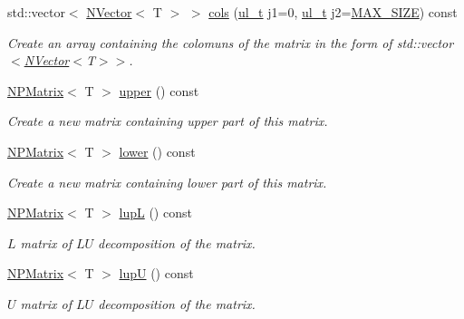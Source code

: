 \begin{Indent}
\begin{DoxyCompactItemize}
std\+::vector$<$ \mbox{\hyperlink{class_n_vector}{N\+Vector}}$<$ T $>$ $>$ \mbox{\hyperlink{class_n_p_matrix_a30c8ad7b415fa92a23375cbad3ee8e37}{cols}} (\mbox{\hyperlink{typedef_8h_a1b140a2034db3f5dfe18a987745df43a}{ul\+\_\+t}} j1=0, \mbox{\hyperlink{typedef_8h_a1b140a2034db3f5dfe18a987745df43a}{ul\+\_\+t}} j2=\mbox{\hyperlink{_n_vector_8h_a0592dba56693fad79136250c11e5a7fe}{M\+A\+X\+\_\+\+S\+I\+ZE}}) const
\begin{DoxyCompactList}\small\item\em Create an array containing the colomuns of the matrix in the form of {\ttfamily std\+::vector$<$\mbox{\hyperlink{class_n_vector}{N\+Vector}}$<$T$>$$>$}. \end{DoxyCompactList}\item 
\mbox{\hyperlink{class_n_p_matrix}{N\+P\+Matrix}}$<$ T $>$ \mbox{\hyperlink{class_n_p_matrix_a986376cd2765f1864fdac8b264f454ef}{upper}} () const
\begin{DoxyCompactList}\small\item\em Create a new matrix containing upper part of this matrix. \end{DoxyCompactList}\item 
\mbox{\hyperlink{class_n_p_matrix}{N\+P\+Matrix}}$<$ T $>$ \mbox{\hyperlink{class_n_p_matrix_a4618b342917acf71c13a89afc2189eaf}{lower}} () const
\begin{DoxyCompactList}\small\item\em Create a new matrix containing lower part of this matrix. \end{DoxyCompactList}\item 
\mbox{\hyperlink{class_n_p_matrix}{N\+P\+Matrix}}$<$ T $>$ \mbox{\hyperlink{class_n_p_matrix_a21088a7eef02d4d0a0781f616037097a}{lupL}} () const
\begin{DoxyCompactList}\small\item\em $ L $ matrix of $ LU $ decomposition of the matrix. \end{DoxyCompactList}\item 
\mbox{\hyperlink{class_n_p_matrix}{N\+P\+Matrix}}$<$ T $>$ \mbox{\hyperlink{class_n_p_matrix_a8da21c409841e612b72232d1159eec21}{lupU}} () const
\begin{DoxyCompactList}\small\item\em $ U $ matrix of $ LU $ decomposition of the matrix. \end{DoxyCompactList}\end{DoxyCompactItemize}
\end{Indent}
